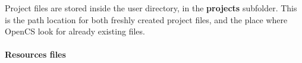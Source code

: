 Project files are stored inside the user directory, in the \textbf{projects} subfolder. This is the path location for both freshly created project files, and the place where Open{CS} look for already existing files.\\

\paragraph{Resources files}
